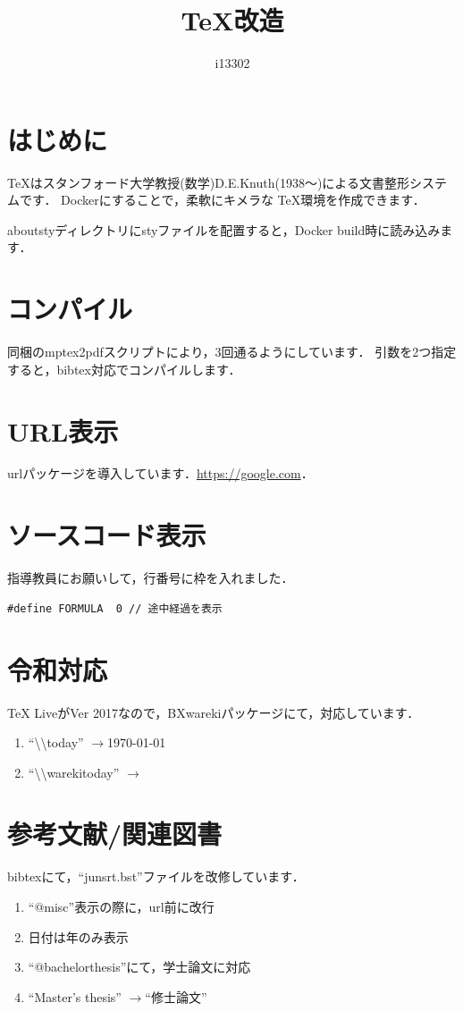 \documentclass[twocolumn,10pt]{jarticle}
\title{\TeX 改造}
\author{i13302}
\date{\warekitoday}
\newcommand{\zr}{$\rightarrow$}
\begin{document}
 
\maketitle 
\section{はじめに}
\TeX はスタンフォード大学教授(数学)D.E.Knuth(1938～)による文書整形システムです\cite{TeX入門}．
Dockerにすることで，柔軟にキメラな \TeX 環境を作成できます．
\par 
aboutstyディレクトリにstyファイルを配置すると，Docker build時に読み込みます．

\section{コンパイル}
同梱のmptex2pdfスクリプトにより，3回通るようにしています．
引数を2つ指定すると，bibtex対応でコンパイルします．

\section{URL表示}
urlパッケージを導入しています．\url{https://google.com}．

\section{ソースコード表示}
指導教員にお願いして，行番号に枠を入れました．

\begin{lstlisting}[caption=FORMURAの定義]
#define FORMULA  0 // 途中経過を表示
\end{lstlisting}



\section{令和対応}
TeX LiveがVer 2017なので，BXwarekiパッケージ\cite{bxwareki}にて，対応しています．

\begin{enumerate}
	\item ``\textbackslash\textbackslash  today'' \zr \today
	\item ``\textbackslash\textbackslash warekitoday'' \zr \warekitoday
\end{enumerate}

\section{参考文献/関連図書}
bibtexにて，``junsrt.bst''ファイルを改修しています．
\begin{enumerate}
	\item ``@misc''表示の際に，url前に改行
	\item 日付は年のみ表示
	\item ``@bachelorthesis''にて，学士論文に対応
	\item ``Master's thesis'' \zr ``修士論文''
\end{enumerate}
\end{document}
